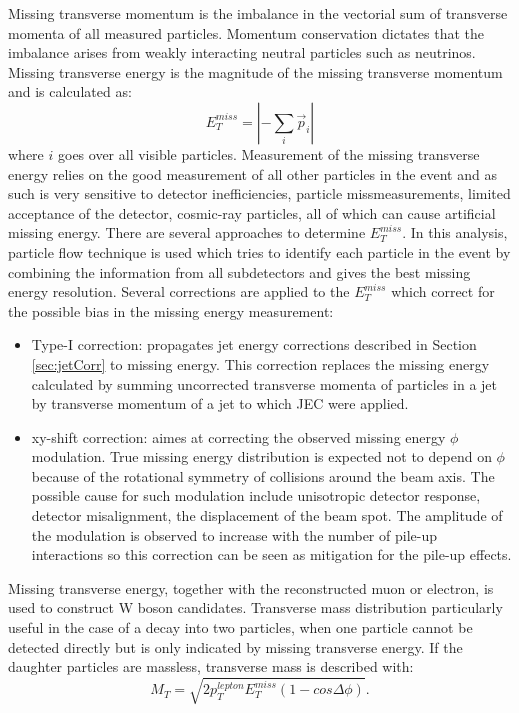 Missing transverse momentum is the imbalance in the vectorial sum of transverse momenta of all measured particles. Momentum conservation dictates that the imbalance arises from weakly interacting neutral particles such as neutrinos. Missing transverse energy is the magnitude of the missing transverse momentum and is calculated as:
\begin{equation}
E_T^{miss}= |-\sum_{i} \vec{p}_i|
\end{equation}
where $i$ goes over all visible particles. Measurement of the missing transverse energy relies on the good measurement of all other particles in the event and as such is very sensitive to detector inefficiencies, particle missmeasurements, limited acceptance of the detector, cosmic-ray particles, all of which can cause artificial missing energy. There are several approaches to determine $E_T^{miss}$. In this analysis, particle flow technique is used which tries to identify each particle in the event by combining the information from all subdetectors and gives the best missing energy resolution.\cite{CMS-PAS-PFT-09-001,Chatrchyan:2011tn} Several corrections are applied to the $E_T^{miss}$ which correct for the possible bias in the missing energy measurement:
\begin{itemize}
\item Type-I correction: propagates jet energy corrections described in Section \ref{sec:jetCorr} to missing energy. This correction replaces the missing energy calculated by summing uncorrected transverse momenta of particles in a jet by transverse momentum of a jet to which JEC were applied.
\item xy-shift correction: aimes at correcting the observed missing energy $\phi$ modulation. True missing energy distribution is expected not to depend on $\phi$ because of the rotational symmetry of collisions around the beam axis. The possible cause for such modulation  include unisotropic detector response, detector misalignment, the displacement of the beam spot. The amplitude of the modulation is observed to increase with the number of pile-up interactions so this correction can be seen as mitigation for the pile-up effects.
\end{itemize}
Missing transverse energy, together with the reconstructed muon or electron, is used to construct W boson candidates. Transverse mass distribution particularly useful in the case of a decay into two particles, when one particle cannot be detected directly but is only indicated by missing transverse energy. If the daughter particles are massless, transverse mass is described with:   
\begin{equation}
M_T=\sqrt{2p_T^{lepton}E_T^{miss}(1-cos\Delta \phi)}.
\end{equation}



